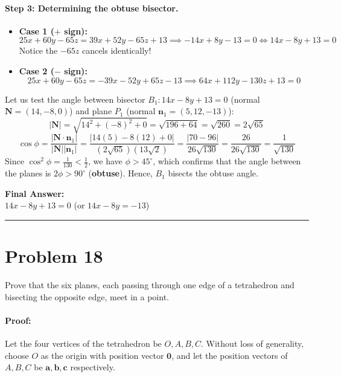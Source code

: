 \documentclass[11pt,a4paper]{article}
\begin{document}
\paragraph{Step 3: Determining the obtuse bisector.}
\begin{itemize}
    \item \textbf{Case 1 ($+$ sign):}
    $$25x + 60y - 65z = 39x + 52y - 65z + 13 \implies -14x + 8y - 13 = 0 \iff 14x - 8y + 13 = 0$$
    Notice the $-65z$ cancels identically!
    \item \textbf{Case 2 ($-$ sign):}
    $$25x + 60y - 65z = -39x - 52y + 65z - 13 \implies 64x + 112y - 130z + 13 = 0$$
\end{itemize}
Let us test the angle between bisector $B_1: 14x - 8y + 13 = 0$ (normal $\mathbf{N} = (14, -8, 0)$) and plane $P_1$ (normal $\mathbf{n}_1 = (5, 12, -13)$):
$$|\mathbf{N}| = \sqrt{14^2 + (-8)^2 + 0} = \sqrt{196 + 64} = \sqrt{260} = 2\sqrt{65}$$
$$\cos\phi = \frac{|\mathbf{N} \cdot \mathbf{n}_1|}{|\mathbf{N}||\mathbf{n}_1|} = \frac{|14(5) - 8(12) + 0|}{(2\sqrt{65})(13\sqrt{2})} = \frac{|70 - 96|}{26\sqrt{130}} = \frac{26}{26\sqrt{130}} = \frac{1}{\sqrt{130}}$$
Since $\cos^2\phi = \frac{1}{130} < \frac{1}{2}$, we have $\phi > 45^\circ$, which confirms that the angle between the planes is $2\phi > 90^\circ$ (\textbf{obtuse}). Hence, $B_1$ bisects the obtuse angle.

\begin{resultbox}
\textbf{Final Answer:}\\
$\boxed{14x - 8y + 13 = 0}$ \quad (or $14x - 8y = -13$)
\end{resultbox}

\vspace{0.4cm}
\hrule
\vspace{0.4cm}

\section{Problem 18}
\begin{problembox}[Problem 18]
Prove that the six planes, each passing through one edge of a tetrahedron and bisecting the opposite edge, meet in a point.
\end{problembox}

\paragraph{Proof:}
Let the four vertices of the tetrahedron be $O, A, B, C$. Without loss of generality, choose $O$ as the origin with position vector $\mathbf{0}$, and let the position vectors of $A, B, C$ be $\mathbf{a}, \mathbf{b}, \mathbf{c}$ respectively.
\end{document}
